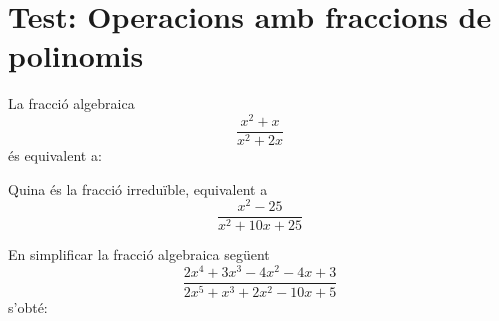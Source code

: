 \section{Test: Operacions amb fraccions de polinomis}


\begin{enumerate}

\pregunta La fracció algebraica 
\begin{equation*}
\frac{x^{2}+x}{x^{2}+2x} 
\end{equation*}és equivalent a:

\begin{enumerate}[label=\alph*)]





\end{enumerate}

\feedback

\pregunta Quina és la fracció irreduïble, equivalent a\begin{equation*}
\frac{x^{2}-25}{x^{2}+10x+25} 
\end{equation*}

\begin{enumerate}[label=\alph*)]





\end{enumerate}

\feedback

\pregunta En simplificar la fracció algebraica següent\begin{equation*}
\frac{2x^{4}+3x^{3}-4x^{2}-4x+3}{2x^{5}+x^{3}+2x^{2}-10x+5} 
\end{equation*}s’obté:

\begin{enumerate}[label=\alph*)]





\end{enumerate}
\end{enumerate}
